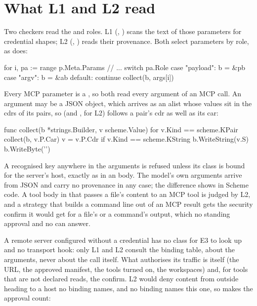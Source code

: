 \section{What L1 and L2 read}

Two checkers read the  and  roles. L1
(, ) scans the text of those
parameters for credential shapes; L2 (, ) reads
their provenance. Both select parameters by role, as 
does:

\begin{go}
for i, pa := range p.Meta.Params {
    // ...
    switch pa.Role {
    case "payload":
        b = &pb
    case "argv":
        b = &ab
    default:
        continue
    }
    collect(b, args[i])
}
\end{go}

Every MCP parameter is a , so both read every argument of an
MCP call. An argument may be a JSON object, which arrives as an alist whose
values sit in the cdrs of its pairs, so  (and
, for L2) follows a pair's cdr as well as its car:

\begin{go}
func collect(b *strings.Builder, v scheme.Value) {
    for v.Kind == scheme.KPair {
        collect(b, v.P.Car)
        v = v.P.Cdr
    }
    if v.Kind == scheme.KString {
        b.WriteString(v.S)
        b.WriteByte('\n')
    }
}
\end{go}

A recognised key anywhere in the arguments is refused unless its class is
bound for the server's host, exactly as in an  body.
The model's own arguments arrive from JSON and carry no provenance in any
case; the difference shows in Scheme code. A tool body in 
that passes a file's content to an MCP tool is judged by L2, and a
strategy that builds a command line out of an MCP result gets the security
confirm it would get for a file's or a command's output, which no standing
approval and no  can answer.

A remote server configured without a credential has no class for E3 to
look up and no transport hook: only L1 and L2 consult the binding table,
about the arguments, never about the call itself. What
authorises its traffic is  itself (the URL, the approved
manifest, the tools turned on, the workspaces) and, for tools that are not
declared reads, the confirm. L2 would deny content from outside heading to
a host no binding names, and no binding names this one, so
 makes the approval count:

